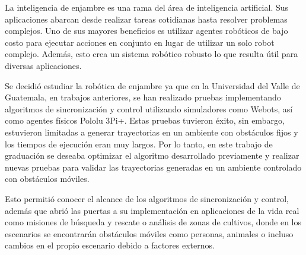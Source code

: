 La inteligencia de enjambre es una rama del área de inteligencia artificial. Sus aplicaciones abarcan desde realizar tareas cotidianas hasta resolver problemas complejos. Uno de sus mayores beneficios es utilizar agentes robóticos de bajo costo para ejecutar acciones en conjunto en lugar de utilizar un solo robot complejo. Además, esto crea un sistema robótico robusto lo que resulta útil para diversas aplicaciones.

Se decidió estudiar la robótica de enjambre ya que en la Universidad del Valle de Guatemala, en trabajos anteriores, se han realizado pruebas implementando algoritmos de sincronización y control utilizando simuladores como Webots, así como agentes físicos Pololu 3Pi+. Estas pruebas tuvieron éxito, sin embargo, estuvieron limitadas a generar trayectorias en un ambiente con obstáculos fijos y los tiempos de ejecución eran muy largos. Por lo tanto, en este trabajo de graduación se deseaba optimizar el algoritmo desarrollado previamente y realizar nuevas pruebas para validar las trayectorias generadas en un ambiente controlado con obstáculos móviles. 

Esto permitió conocer el alcance de los algoritmos de sincronización y control, además que abrió las puertas a su implementación en aplicaciones de la vida real como misiones de búsqueda y rescate o análisis de zonas de cultivos, donde en los escenarios se encontrarán obstáculos móviles como personas, animales o incluso cambios en el propio escenario debido a factores externos.
